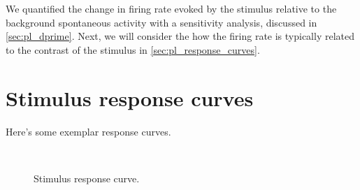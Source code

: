 We quantified the change in firing rate evoked by the stimulus relative to the background spontaneous activity with a sensitivity analysis, discussed in \autoref{sec:pl_dprime}.
Next, we will consider the how the firing rate is typically related to the contrast of the stimulus in \autoref{sec:pl_response_curves}.


\section{Stimulus response curves}
\label{sec:pl_response_curves}

Here's some exemplar response curves.

\begin{figure}[htbp]
    \centering
    \hspace*{\fill}
    \hspace{.4cm}
    \hspace*{\fill}
    \\
    \hspace*{\fill}
    \hspace{.4cm}
    \hspace*{\fill}
    \caption{Stimulus response curve.
}
    \label{fig:respcurve}
\end{figure}
